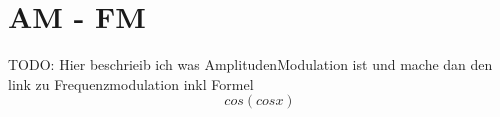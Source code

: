 %
%
%
\section{AM - FM\label{fm:section:teil0}}

TODO:
Hier beschrieib ich was AmplitudenModulation ist und mache dan den link zu Frequenzmodulation inkl Formel \[cos( cos x)\]



